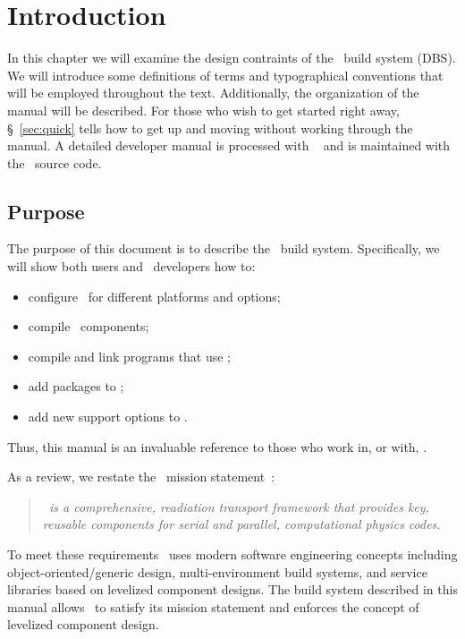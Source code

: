 
\chapter{Introduction}

In this chapter we will examine the %
design contraints of the \draco\ build system (DBS).  We will
introduce some definitions of terms and typographical conventions that
will be employed throughout the text.  Additionally, the organization
of the manual will be described.  For those who wish to get started
right away, \S~\ref{sec:quick} tells how to get up and moving without
working through the manual.  A detailed developer manual is processed
with ~\cite{doxygen} and is maintained with the
\draco\ source code.


\section{Purpose}
\label{sec:purpose}

The purpose of this document is to describe the \draco\ build system.
Specifically, we will show both users and \draco\ developers how to: 
\begin{itemize}
\item configure \draco\ for different platforms and options;
\item compile \draco\ components;
\item compile and link programs that use \draco;
\item add packages to \draco;
\item add new support options to \draco.
\end{itemize}
Thus, this manual is an invaluable reference to those who work in, or
with, \draco.

As a review, we restate the \draco\ mission statement~\cite{rn98046}:
\begin{quote}
  \slshape \draco\ is a comprehensive, readiation transport framework
  that provides key, reusable components for serial and parallel,
  computational physics codes.
\end{quote}
To meet these requirements \draco\ uses modern software engineering
concepts including object-oriented/\-generic design, multi-environment
build systems, and service libraries based on levelized component
designs.  The build system described in this manual allows \draco\ to
satisfy its mission statement and enforces the concept of levelized
component design.

